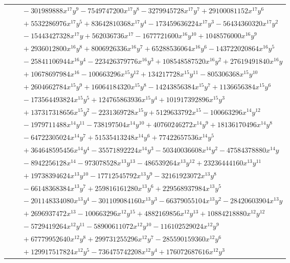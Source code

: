 \documentclass[11pt]{article}
\begin{document}
\begin{longtable}{@{}ll@{}}
 & $\quad -301989888x^{17}y^{9}-7549747200x^{17}y^{8}-3279945728x^{17}y^{7}+29100081152x^{17}y^{6}$\\
 & $\quad +5532286976x^{17}y^{5}+83642810368x^{17}y^{4}-173459636224x^{17}y^{3}-56434360320x^{17}y^{2}$\\
 & $\quad -15443427328x^{17}y+562036736x^{17}-1677721600x^{16}y^{10}+1048576000x^{16}y^{9}$\\
 & $\quad +2936012800x^{16}y^{8}+8006926336x^{16}y^{7}+65288536064x^{16}y^{6}-143722020864x^{16}y^{5}$\\
 & $\quad -25841106944x^{16}y^{4}-223426379776x^{16}y^{3}+108548587520x^{16}y^{2}+27619491840x^{16}y$\\
 & $\quad +10678697984x^{16}-100663296x^{15}y^{12}+134217728x^{15}y^{11}-805306368x^{15}y^{10}$\\
 & $\quad +2604662784x^{15}y^{9}+16064184320x^{15}y^{8}-14243856384x^{15}y^{7}+1136656384x^{15}y^{6}$\\
 & $\quad -173564493824x^{15}y^{5}+124765863936x^{15}y^{4}+101917392896x^{15}y^{3}$\\
 & $\quad +137317318656x^{15}y^{2}-2231369728x^{15}y+5129633792x^{15}-100663296x^{14}y^{12}$\\
 & $\quad -1979711488x^{14}y^{11}-738197504x^{14}y^{10}+40760246272x^{14}y^{9}+18136170496x^{14}y^{8}$\\
 & $\quad -64722305024x^{14}y^{7}+51535413248x^{14}y^{6}+77422657536x^{14}y^{5}$\\
 & $\quad +364648595456x^{14}y^{4}-35571892224x^{14}y^{3}-50340036608x^{14}y^{2}-47584378880x^{14}y$\\
 & $\quad -8942256128x^{14}-973078528x^{13}y^{13}-486539264x^{13}y^{12}+23236444160x^{13}y^{11}$\\
 & $\quad +19738394624x^{13}y^{10}-17712545792x^{13}y^{9}-32161923072x^{13}y^{8}$\\
 & $\quad -66148368384x^{13}y^{7}+259816161280x^{13}y^{6}+229568937984x^{13}y^{5}$\\
 & $\quad -201148334080x^{13}y^{4}-301109084160x^{13}y^{3}-66379055104x^{13}y^{2}-28420603904x^{13}y$\\
 & $\quad +2696937472x^{13}-100663296x^{12}y^{15}+4882169856x^{12}y^{13}+10884218880x^{12}y^{12}$\\
 & $\quad -5729419264x^{12}y^{11}-58900611072x^{12}y^{10}-116102529024x^{12}y^{9}$\\
 & $\quad +67779952640x^{12}y^{8}+299731255296x^{12}y^{7}-285590159360x^{12}y^{6}$\\
 & $\quad +129917517824x^{12}y^{5}-736475742208x^{12}y^{4}+176072687616x^{12}y^{3}$\\

\end{longtable}
\end{document}
